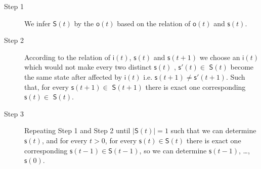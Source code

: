 
 
\begin{description}
	\item[Step 1] We infer $\mathsf{S}(t)$ by the $\mathsf{o}(t)$ based on the relation of $\mathsf{o}(t)$ and $\mathsf{s}(t)$.
	\item[Step 2] According to the relation of $\mathsf{i}(t)$, $\mathsf{s}(t)$ and $\mathsf{s}(t+1)$ we choose an $\mathsf{i}(t)$ which would not make every two distinct $\mathsf{s}(t)$ , $\mathsf{s}'(t)$$\in$ $\mathsf{S}(t)$ become the same state after affected by $\mathsf{i}(t)$ i.e. $\mathsf{s}(t+1)\ne\mathsf{s}'(t+1)$. Such that, for every $\mathsf{s}(t+1)\in $ $\mathsf{S}(t+1)$ there is exact one corresponding $\mathsf{s}(t)\in $ $\mathsf{S}(t)$.
	\item[Step 3] Repeating Step 1 and Step 2 until $|\mathsf{S}(t)|=1$ such that we can determine $\mathsf{s}(t)$, and for every $t>0$, for every $\mathsf{s}(t)\in \mathsf{S}(t)$ there is exact one corresponding $\mathsf{s}(t-1)\in \mathsf{S}(t-1)$, so we can determine $\mathsf{s}(t-1)$, \ldots, $\mathsf{s}(0)$.
\end{description}



